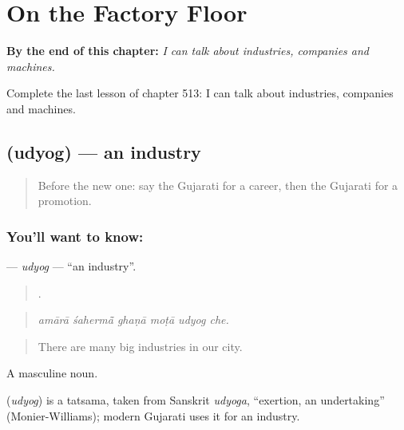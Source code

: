 
\chapter{On the Factory Floor}
\label{ch:gu-on-the-factory-floor}

\begin{chapteropening}
\textbf{By the end of this chapter:} \emph{I can talk about industries, companies and machines.}

Complete the last lesson of chapter 513: I can talk about industries, companies and machines.
\end{chapteropening}

\section[\texorpdfstring{\gu{ઉદ્યોગ} (udyog)}{ઉદ્યોગ (udyog)}]{ (udyog) — an industry}

\label{lesson:GU-C513-udyog}



\begin{quote}
Before the new one: say the Gujarati for a career, then the Gujarati for a promotion.
\end{quote}

\subsection*{You'll want to know: }
\textbf{} — \emph{udyog} — \textquotedblleft{}an industry\textquotedblright{}.

\begin{quote}
     .
\end{quote}

\begin{quote}
\emph{amārā śahermā̃ ghaṇā moṭā udyog che.}
\end{quote}

\begin{quote}
There are many big industries in our city.
\end{quote}

A masculine noun.

\begin{cousinweb}
\textbf{} (\emph{udyog}) is a tatsama, taken from Sanskrit \emph{udyoga}, \textquotedblleft{}exertion, an undertaking\textquotedblright{} (Monier-Williams); modern Gujarati uses it for an industry.
\end{cousinweb}

